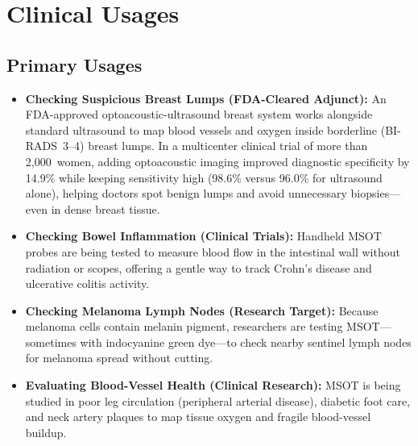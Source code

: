 \section{Clinical Usages}

\subsection{Primary Usages}
\begin{itemize}
  \item \textbf{Checking Suspicious Breast Lumps (FDA-Cleared Adjunct):} An FDA-approved optoacoustic-ultrasound breast system works alongside standard ultrasound to map blood vessels and oxygen inside borderline (BI-RADS~3--4) breast lumps. In a multicenter clinical trial of more than 2,000~women, adding optoacoustic imaging improved diagnostic specificity by 14.9\% while keeping sensitivity high (98.6\% versus 96.0\% for ultrasound alone), helping doctors spot benign lumps and avoid unnecessary biopsies---even in dense breast tissue.
  \item \textbf{Checking Bowel Inflammation (Clinical Trials):} Handheld MSOT probes are being tested to measure blood flow in the intestinal wall without radiation or scopes, offering a gentle way to track Crohn's disease and ulcerative colitis activity.
  \item \textbf{Checking Melanoma Lymph Nodes (Research Target):} Because melanoma cells contain melanin pigment, researchers are testing MSOT---sometimes with indocyanine green dye---to check nearby sentinel lymph nodes for melanoma spread without cutting.
  \item \textbf{Evaluating Blood-Vessel Health (Clinical Research):} MSOT is being studied in poor leg circulation (peripheral arterial disease), diabetic foot care, and neck artery plaques to map tissue oxygen and fragile blood-vessel buildup.
\end{itemize}

